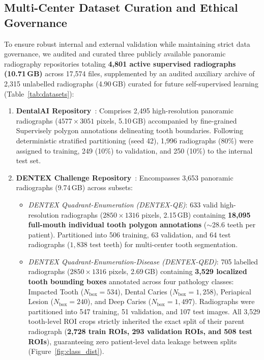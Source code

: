 \documentclass[review]{elsarticle}
\begin{document}
\subsection{Multi-Center Dataset Curation and Ethical Governance}
\label{sec:datasets}
To ensure robust internal and external validation while maintaining strict data governance, we audited and curated three publicly available panoramic radiography repositories totaling \textbf{4,801 active supervised radiographs (10.71\,GB)} across 17,574 files, supplemented by an audited auxiliary archive of 2,315 unlabelled radiographs (4.90\,GB) curated for future self-supervised learning (Table~\ref{tab:datasets}):
\begin{enumerate}
    \item \textbf{DentalAI Repository}~\cite{silva2021automatic, jader2018deep}: Comprises 2,495 high-resolution panoramic radiographs ($4577 \times 3051$ pixels, 5.10\,GB) accompanied by fine-grained Supervisely polygon annotations delineating tooth boundaries. Following deterministic stratified partitioning (seed 42), 1,996 radiographs (80\%) were assigned to training, 249 (10\%) to validation, and 250 (10\%) to the internal test set.
    \item \textbf{DENTEX Challenge Repository}~\cite{hamamci2023dentex}: Encompasses 3,653 panoramic radiographs (9.74\,GB) across subsets:
    \begin{itemize}
        \item \emph{DENTEX Quadrant-Enumeration (DENTEX-QE)}: 633 valid high-resolution radiographs ($2850 \times 1316$ pixels, 2.15\,GB) containing \textbf{18,095 full-mouth individual tooth polygon annotations} ($\sim$28.6 teeth per patient). Partitioned into 506 training, 63 validation, and 64 test radiographs ($1,838$ test teeth) for multi-center tooth segmentation.
        \item \emph{DENTEX Quadrant-Enumeration-Disease (DENTEX-QED)}: 705 labelled radiographs ($2850 \times 1316$ pixels, 2.69\,GB) containing \textbf{3,529 localized tooth bounding boxes} annotated across four pathology classes: Impacted Tooth ($N_{\text{box}}=534$), Dental Caries ($N_{\text{box}}=1,258$), Periapical Lesion ($N_{\text{box}}=240$), and Deep Caries ($N_{\text{box}}=1,497$). Radiographs were partitioned into 547 training, 51 validation, and 107 test images. All 3,529 tooth-level ROI crops strictly inherited the exact split of their parent radiograph (\textbf{2,728 train ROIs, 293 validation ROIs, and 508 test ROIs}), guaranteeing zero patient-level data leakage between splits (Figure~\ref{fig:class_dist}).

\end{itemize}
\end{enumerate}
\end{document}
